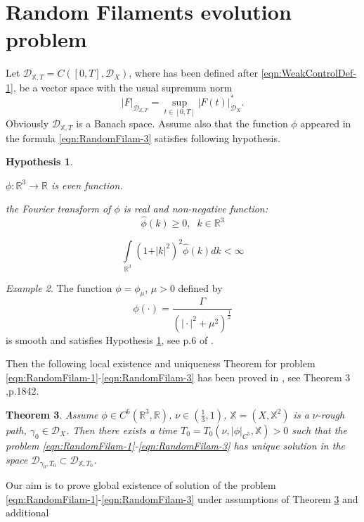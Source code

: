 \documentclass[11pt,a4paper,leqno]{amsart}%
\newcommand\half{\frac12}
\theoremstyle{plain}
\newtheorem{theorem}{Theorem}[section]
\theoremstyle{remark}
\newtheorem{example}[theorem]{Example}
\theoremstyle{plain}
\newtheorem{hypothesis}[theorem]{Hypothesis}
\numberwithin{equation}{section}
\def\Rnu{{\mathbb R}}
\def\supl{\sup\limits}
\def\intl{\int\limits}
\def\supl{\mathop{\sup}\limits}
\begin{document}
\section{Random Filaments evolution problem}
Let $\mathcal{D}_{\mathbb{X},T}=C([0,T],\mathcal{D}_X)$, where has been defined after 
\eqref{eqn:WeakControlDef-1},  be a
vector space with the usual supremum norm
\begin{equation}
\vert F\vert_{\mathcal{D}_{\mathbb{X},T}}=\supl_{t\in[0,T]}\vert F(t)\vert_{\mathcal{D}_X}^*\label{eqn:NormDef}.
\end{equation}
Obviously $\mathcal{D}_{\mathbb{X},T}$ is a Banach space. Assume
also that the function $\phi$ appeared in the formula
\eqref{eqn:RandomFilam-3} satisfies following hypothesis.
\begin{hypothesis}\label{hyp:PhiAssumptions}
\begin{trivlist}
\item[(i)]$\phi:\mathbb{R}^3\to\mathbb{R}$ is even function.
\item[(ii)] the Fourier transform of $\phi$ is real and
non-negative function:
$$
\hat{\phi}(k)\geq 0,\;\;k\in\Rnu^3
$$
\item[(iii)]
$$
\intl_{\Rnu^3}(1+\vert k\vert^2)^2\hat{\phi}(k)dk<\infty
$$
\end{trivlist}
\end{hypothesis}
\begin{example}
The function $\phi=\phi_\mu$, $\mu>0$ defined by
$$\phi(\cdot)=\frac{\Gamma}{(\vert \cdot\vert^2+\mu^2)^{\half}}$$
is smooth and satisfies Hypothesis \ref{hyp:PhiAssumptions}, see p.6
of \cite{[Bers+Gub_2007]}.
\end{example}
Then the following local existence and uniqueness Theorem for
problem \eqref{eqn:RandomFilam-1}-\eqref{eqn:RandomFilam-3} has
been proved in \cite{[Bess+Gub_2005]}, see Theorem
$3$,p.1842.
\begin{theorem}\label{thm:LocalExistUniq}
Assume $\phi\in C^6(\Rnu^3,\Rnu)$, $\nu\in (\frac{1}{3},1)$,
$\mathbb{X}=(X,\mathbb{X}^2)$ is a $\nu$-rough path, $\gamma_0\in
\mathcal{D}_X$. Then there exists a time
$T_0=T_0(\nu,\vert \phi\vert_{C^5},\mathbb{X})>0$ such that the problem
\eqref{eqn:RandomFilam-1}-\eqref{eqn:RandomFilam-3} has unique
solution in the space  $\mathcal{D}_{\gamma_0,T_0}\subset\mathcal{D}_{\mathbb{X},T_0}$.
\end{theorem}
Our aim is to prove global existence of solution of the problem
\eqref{eqn:RandomFilam-1}-\eqref{eqn:RandomFilam-3} under
assumptions of Theorem \ref{thm:LocalExistUniq} and additional
\end{document}
